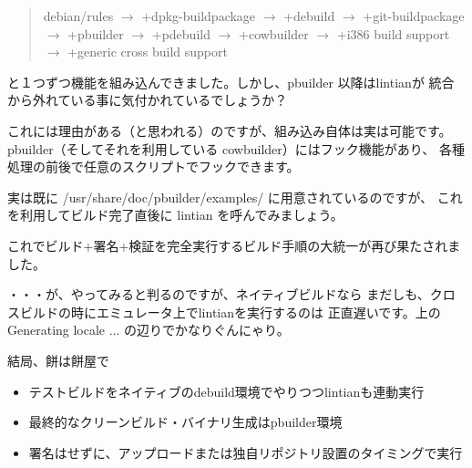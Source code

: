 \documentclass[mingoth,a4paper]{jsarticle}
\begin{document}
\begin{quote}
debian/rules
$\rightarrow$ +dpkg-buildpackage
$\rightarrow$ +debuild
$\rightarrow$ +git-buildpackage
$\rightarrow$ +pbuilder
$\rightarrow$ +pdebuild
$\rightarrow$ +cowbuilder
$\rightarrow$ +i386 build support
$\rightarrow$ +generic cross build support
\end{quote}

と１つずつ機能を組み込んできました。しかし、pbuilder 以降はlintianが
統合から外れている事に気付かれているでしょうか？

これには理由がある（と思われる）のですが、組み込み自体は実は可能です。
pbuilder（そしてそれを利用している cowbuilder）にはフック機能があり、
各種処理の前後で任意のスクリプトでフックできます。

実は既に /usr/share/doc/pbuilder/examples/ に用意されているのですが、
これを利用してビルド完了直後に lintian を呼んでみましょう。


これでビルド+署名+検証を完全実行するビルド手順の大統一が再び果たされました。

・・・が、やってみると判るのですが、ネイティブビルドなら
まだしも、クロスビルドの時にエミュレータ上でlintianを実行するのは
正直遅いです。上の Generating locale ... の辺りでかなりぐんにゃり。

結局、餅は餅屋で

\begin{itemize}
\item テストビルドをネイティブのdebuild環境でやりつつlintianも連動実行
\item 最終的なクリーンビルド・バイナリ生成はpbuilder環境
\item 署名はせずに、アップロードまたは独自リポジトリ設置のタイミングで実行
\end{itemize}
\end{document}
